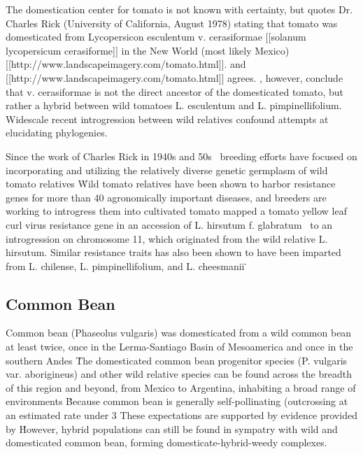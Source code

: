 \documentclass[11pt]{article}
\begin{document}
The domestication center for tomato is not known with certainty, but \cite{sims1979history} quotes Dr. Charles Rick (University of California, August 1978) stating that tomato was domesticated from Lycopersicon esculentum v. cerasiformae [[solanum lycopersicum cerasiforme]] in the New World (most likely Mexico) [[http://www.landscapeimagery.com/tomato.html]].
\cite{robertson2007genetic, bai2007domestication} and [[http://www.landscapeimagery.com/tomato.html]] agrees.
\cite{nesbitt2002comparative}, however, conclude that v. cerasiformae is not the direct ancestor of the domesticated tomato, but rather a hybrid between wild tomatoes L. esculentum and L. pimpinellifolium.
Widescale recent introgression between wild relatives confound attempts at elucidating phylogenies.

Since the work of Charles Rick in 1940s and 50s \cite{rick1953novel}\, breeding efforts have focused on incorporating and utilizing the relatively diverse genetic germplasm of wild tomato relatives \cite{rick1988tomato, miller1990rflp, rick1982potential}\.
Wild tomato relatives have been shown to harbor resistance genes for more than 40 agronomically important diseases, and breeders are working to introgress them into cultivated tomato \cite{rick1995utilization}\.
\cite{hanson2000mapping} mapped a tomato yellow leaf curl virus resistance gene in an accession of L. hirsutum f. glabratum \cite{banerjee1990transfer}\ to an introgression on chromosome 11, which originated from the wild relative L. hirsutum.
Similar resistance traits has also been shown to have been imparted from L. chilense, L. pimpinellifolium, and L. cheesmanii \cite{hanson2000mapping}\.

\subsection*{Common Bean}

Common bean (Phaseolus vulgaris) was domesticated from a wild common bean at least twice, once in the Lerma-Santiago Basin of Mesoamerica and once in the southern Andes \cite{kwak2009putative}\.
The domesticated common bean progenitor species (P. vulgaris var. aborigineus) and other wild relative species can be found across the breadth of this region and beyond, from Mexico to Argentina, inhabiting a broad range of environments \cite{debouck1988implications, CWR}\.
Because common bean is generally self-pollinating (outcrossing at an estimated rate under 3%
These expectations are supported by evidence provided by \cite{papa2003asymmetry}\.
However, hybrid populations can still be found in sympatry with wild and domesticated common bean, forming domesticate-hybrid-weedy complexes.
\end{document}
